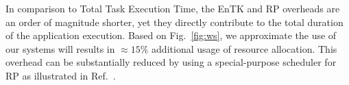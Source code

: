 In comparison to Total Task Execution Time, the EnTK and RP overheads are an
order of magnitude shorter, yet they directly contribute to the total
duration of the application execution. Based on Fig.~\ref{fig:ws}, we
approximate the use of our systems will results in $\approx15\%$ additional
usage of resource allocation. This overhead can be substantially reduced by
using a special-purpose scheduler for RP as illustrated in
Ref.~\cite{merzky2018}.









